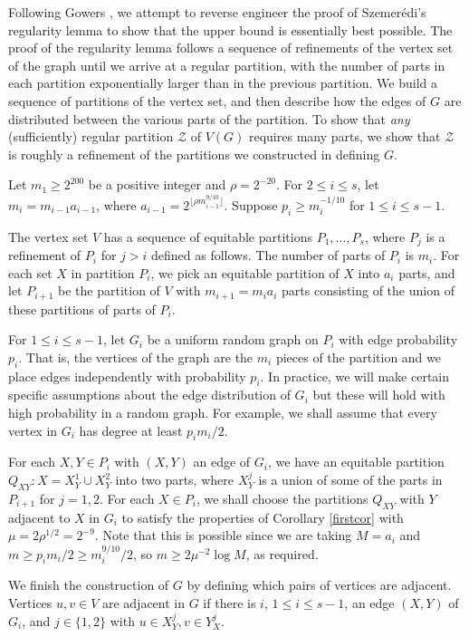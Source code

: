 \documentclass[11pt]{article}
\begin{document}
Following Gowers \cite{Go}, we attempt to reverse engineer the proof of Szemer\'edi's regularity lemma to show that the upper bound is essentially best possible. The proof of
the regularity lemma follows a sequence of refinements of the vertex set of the
graph until we arrive at a regular partition, with the number of parts in each
partition exponentially larger than in the previous partition. We build a
sequence of partitions of the vertex set, and then describe how the edges of
$G$ are distributed between the various parts of the partition.  To show that
{\it any} (sufficiently) regular partition $\mathcal{Z}$ of $V(G)$ requires
many parts, we show that $\mathcal{Z}$ is roughly a refinement of the
partitions we constructed in defining $G$.

Let $m_1 \geq 2^{200}$ be a positive integer and $\rho=2^{-20}$. For $2 \leq i
\leq s$, let $m_i=m_{i-1}a_{i-1}$, where $a_{i-1}=2^{\lfloor \rho
m_{i-1}^{9/10}\rfloor}$. Suppose $p_i \geq m_i^{-1/10}$ for $1 \leq i \leq
s-1$.

The vertex set $V$ has a sequence of equitable partitions $P_1,\ldots,P_s$,
where $P_j$ is a refinement of $P_i$ for $j>i$ defined as follows. The number
of parts of $P_i$ is $m_i$. For each set $X$ in partition $P_i$, we pick an
equitable partition of $X$ into $a_i$ parts, and let $P_{i+1}$ be the partition
of $V$ with $m_{i+1}=m_{i}a_i$ parts consisting of the union of these
partitions of parts of $P_i$.

For $1 \leq i \leq s-1$, let $G_i$ be a uniform random graph on $P_i$ with edge
probability $p_i$. That is, the vertices of the graph are the $m_i$ pieces of
the partition and we place edges independently with probability $p_i$. In
practice, we will make certain specific assumptions about the edge distribution
of $G_i$ but these will hold with high probability in a random graph. For
example, we shall assume that every vertex in $G_i$ has degree at least $p_i
m_i/2$.

For each $X,Y \in P_i$ with $(X,Y)$ an edge of $G_i$, we have an equitable
partition
$Q_{XY}:X=X^1_Y \cup X^2_Y$ into two parts, where $X^j_Y$ is a union of some of
the parts in
$P_{i+1}$ for $j=1,2$. For each $X \in P_i$, we shall choose the partitions
$Q_{XY}$ with $Y$
adjacent to $X$ in $G_i$ to satisfy the properties of Corollary \ref{firstcor}
with $\mu = 2\rho^{1/2}=2^{-9}$. Note that this is possible since we are taking
$M = a_{i}$ and $m \geq p_i m_i/2 \geq m_i^{9/10}/2$, so $m \geq 2 \mu^{-2}
\log M$, as required.

We finish the construction of $G$ by defining which pairs of vertices are
adjacent. Vertices $u,v \in V$ are adjacent in $G$ if there is $i$, $1 \leq i
\leq s-1$, an edge $(X,Y)$ of $G_i$, and $j \in \{1,2\}$ with $u \in X^j_Y, v
\in Y^j_X$.
\end{document}
